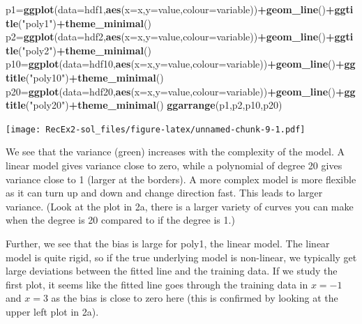 \documentclass[]{article}
\newenvironment{Shaded}{\begin{snugshade}}{\end{snugshade}}
\newcommand{\KeywordTok}[1]{\textcolor[rgb]{0.13,0.29,0.53}{\textbf{#1}}}
\newcommand{\DataTypeTok}[1]{\textcolor[rgb]{0.13,0.29,0.53}{#1}}
\newcommand{\StringTok}[1]{\textcolor[rgb]{0.31,0.60,0.02}{#1}}
\newcommand{\OperatorTok}[1]{\textcolor[rgb]{0.81,0.36,0.00}{\textbf{#1}}}
\newcommand{\NormalTok}[1]{#1}
\begin{document}
\begin{Shaded}
\begin{Highlighting}[]
\NormalTok{p1=}\KeywordTok{ggplot}\NormalTok{(}\DataTypeTok{data=}\NormalTok{hdf1,}\KeywordTok{aes}\NormalTok{(}\DataTypeTok{x=}\NormalTok{x,}\DataTypeTok{y=}\NormalTok{value,}\DataTypeTok{colour=}\NormalTok{variable))}\OperatorTok{+}\KeywordTok{geom_line}\NormalTok{()}\OperatorTok{+}\KeywordTok{ggtitle}\NormalTok{(}\StringTok{"poly1"}\NormalTok{)}\OperatorTok{+}\KeywordTok{theme_minimal}\NormalTok{()}
\NormalTok{p2=}\KeywordTok{ggplot}\NormalTok{(}\DataTypeTok{data=}\NormalTok{hdf2,}\KeywordTok{aes}\NormalTok{(}\DataTypeTok{x=}\NormalTok{x,}\DataTypeTok{y=}\NormalTok{value,}\DataTypeTok{colour=}\NormalTok{variable))}\OperatorTok{+}\KeywordTok{geom_line}\NormalTok{()}\OperatorTok{+}\KeywordTok{ggtitle}\NormalTok{(}\StringTok{"poly2"}\NormalTok{)}\OperatorTok{+}\KeywordTok{theme_minimal}\NormalTok{()}
\NormalTok{p10=}\KeywordTok{ggplot}\NormalTok{(}\DataTypeTok{data=}\NormalTok{hdf10,}\KeywordTok{aes}\NormalTok{(}\DataTypeTok{x=}\NormalTok{x,}\DataTypeTok{y=}\NormalTok{value,}\DataTypeTok{colour=}\NormalTok{variable))}\OperatorTok{+}\KeywordTok{geom_line}\NormalTok{()}\OperatorTok{+}\KeywordTok{ggtitle}\NormalTok{(}\StringTok{"poly10"}\NormalTok{)}\OperatorTok{+}\KeywordTok{theme_minimal}\NormalTok{()}
\NormalTok{p20=}\KeywordTok{ggplot}\NormalTok{(}\DataTypeTok{data=}\NormalTok{hdf20,}\KeywordTok{aes}\NormalTok{(}\DataTypeTok{x=}\NormalTok{x,}\DataTypeTok{y=}\NormalTok{value,}\DataTypeTok{colour=}\NormalTok{variable))}\OperatorTok{+}\KeywordTok{geom_line}\NormalTok{()}\OperatorTok{+}\KeywordTok{ggtitle}\NormalTok{(}\StringTok{"poly20"}\NormalTok{)}\OperatorTok{+}\KeywordTok{theme_minimal}\NormalTok{()}
\KeywordTok{ggarrange}\NormalTok{(p1,p2,p10,p20)}
\end{Highlighting}
\end{Shaded}

\texttt{[image: RecEx2-sol\_files/figure-latex/unnamed-chunk-9-1.pdf]}

We see that the variance (green) increases with the complexity of the
model. A linear model gives variance close to zero, while a polynomial
of degree 20 gives variance close to 1 (larger at the borders). A more
complex model is more flexible as it can turn up and down and change
direction fast. This leads to larger variance. (Look at the plot in 2a,
there is a larger variety of curves you can make when the degree is 20
compared to if the degree is 1.)

Further, we see that the bias is large for poly1, the linear model. The
linear model is quite rigid, so if the true underlying model is
non-linear, we typically get large deviations between the fitted line
and the training data. If we study the first plot, it seems like the
fitted line goes through the training data in \(x=-1\) and \(x=3\) as
the bias is close to zero here (this is confirmed by looking at the
upper left plot in 2a).
\end{document}
